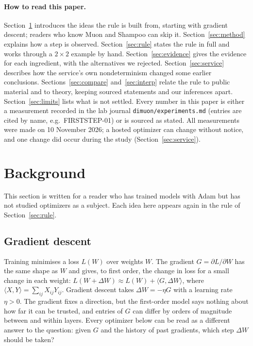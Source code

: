 \documentclass[11pt]{article}
\begin{document}
\paragraph{How to read this paper.} Section~\ref{sec:background} introduces the ideas the rule is
built from, starting with gradient descent; readers who know Muon and Shampoo can skip it.
Section~\ref{sec:method} explains how a step is observed. Section~\ref{sec:rule} states the rule
in full and works through a $2\times2$ example by hand. Section~\ref{sec:evidence} gives the evidence
for each ingredient, with the alternatives we rejected. Section~\ref{sec:service} describes how the
service's own nondeterminism changed some earlier conclusions. Sections~\ref{sec:compare}
and~\ref{sec:interp} relate the rule to public material and to theory, keeping sourced statements
and our inferences apart. Section~\ref{sec:limits} lists what is not settled. Every number in this
paper is either a measurement recorded in the lab journal \texttt{dimuon/experiments.md} (entries
are cited by name, e.g.\ FIRSTSTEP-01) or is sourced as stated. All measurements
were made on 10 November 2026; a hosted optimizer can change without notice, and one change did occur
during the study (Section~\ref{sec:service}).

\section{Background}\label{sec:background}

This section is written for a reader who has trained models with Adam but has not studied
optimizers as a subject. Each idea here appears again in the rule of Section~\ref{sec:rule}.

\subsection{Gradient descent}
Training minimises a loss $L(W)$ over weights $W$. The gradient $G=\partial L/\partial W$ has the
same shape as $W$ and gives, to first order, the change in loss for a small change in each weight:
$L(W+\Delta W)\approx L(W)+\langle G,\Delta W\rangle$, where $\langle X,Y\rangle=\sum_{ij}X_{ij}Y_{ij}$.
Gradient descent takes $\Delta W=-\eta G$ with a learning rate $\eta>0$. The gradient fixes a
direction, but the first-order model says nothing about how far it can be trusted, and entries of
$G$ can differ by orders of magnitude between and within layers. Every optimizer below can be read as
a different answer to the question: given $G$ and the history of past gradients, which step
$\Delta W$ should be taken?
\end{document}
